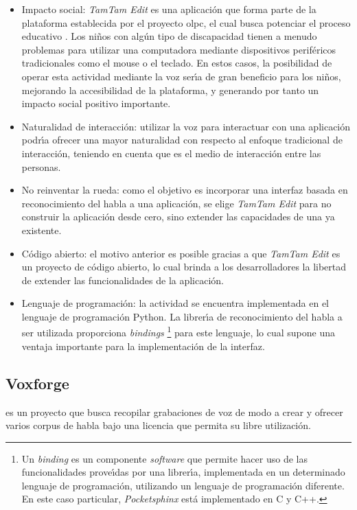 \begin{itemize}
    \item Impacto social: \emph{TamTam Edit} es una aplicaci\'on que forma parte de la plataforma establecida
    por el proyecto \gls{olpc}, el cual busca potenciar el proceso educativo \cite{OLPC}. 
    Los ni\~nos con alg\'un tipo de discapacidad tienen a menudo problemas para utilizar una computadora mediante
    dispositivos perif\'ericos tradicionales como el mouse o el teclado. 
    En estos casos, la posibilidad de operar esta actividad mediante la voz ser{\'\i}a de gran beneficio 
    para los ni\~nos, mejorando la accesibilidad de la plataforma, y generando por tanto un impacto social
    positivo importante.
    \item Naturalidad de interacci\'on: utilizar la voz para interactuar con una aplicaci\'on podr{\'\i}a
    ofrecer una mayor naturalidad con respecto al enfoque tradicional de interacci\'on, teniendo en cuenta
    que es el medio de interacci\'on entre las personas.
    \item No reinventar la rueda: como el objetivo es incorporar una interfaz basada en reconocimiento del
    habla a una aplicaci\'on, se elige \emph{TamTam Edit} para no construir la aplicaci\'on desde cero, sino 
    extender las capacidades de una ya existente.
    \item C\'odigo abierto: el motivo anterior es posible gracias a que \emph{TamTam Edit} es un proyecto de 
    c\'odigo abierto, lo cual brinda a los desarrolladores la libertad de extender las funcionalidades de la 
    aplicaci\'on.
    \item Lenguaje de programaci\'on: la actividad se encuentra implementada en el lenguaje de programaci\'on
    Python. La librer{\'\i}a de reconocimiento del habla a ser utilizada proporciona \emph{bindings} 
    \footnote{Un \emph{binding} es un componente \emph{software}
   que permite hacer uso de las funcionalidades prove{\'\i}das por una librer{\'\i}a, implementada
    en un determinado lenguaje de programaci\'on, utilizando un lenguaje de programaci\'on diferente. 
    En este caso particular, \emph{Pocketsphinx} est\'a implementado en C y C++.} para 
    este lenguaje, lo cual supone una ventaja importante para la implementaci\'on de la interfaz.
\end{itemize}


\subsection{Voxforge}
 es un proyecto que busca recopilar grabaciones de voz de modo a crear 
y ofrecer varios corpus de habla bajo una licencia que permita su libre utilizaci\'on. 

